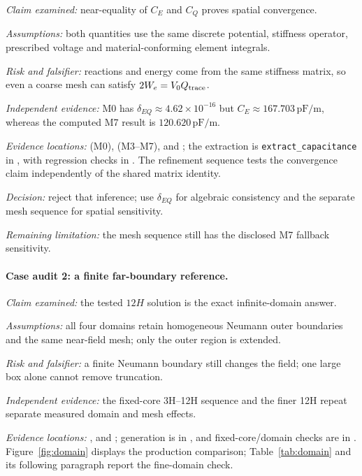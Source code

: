 \documentclass[11pt]{article}
\begin{document}
\noindent\textit{Claim examined:} near-equality of $C_E$ and $C_Q$ proves spatial convergence.

\noindent\textit{Assumptions:} both quantities use the same discrete potential, stiffness operator, prescribed voltage and material-conforming element integrals.

\noindent\textit{Risk and falsifier:} reactions and energy come from the same stiffness matrix, so even a coarse mesh can satisfy $2W_e=V_0Q_{\rm trace}$.

\noindent\textit{Independent evidence:} M0 has $\delta_{EQ}\approx4.62\times10^{-16}$ but $C_E\approx167.703\,\mathrm{pF/m}$, whereas the computed M7 result is $120.620\,\mathrm{pF/m}$.

\noindent\textit{Evidence locations:}  (M0),  (M3--M7), and ; the extraction is \texttt{extract\_capacitance} in , with regression checks in . The refinement sequence tests the convergence claim independently of the shared matrix identity.

\noindent\textit{Decision:} reject that inference; use $\delta_{EQ}$ for algebraic consistency and the separate mesh sequence for spatial sensitivity.

\noindent\textit{Remaining limitation:} the mesh sequence still has the disclosed M7 fallback sensitivity.

\paragraph{Case audit 2: a finite far-boundary reference.}

\noindent\textit{Claim examined:} the tested $12H$ solution is the exact infinite-domain answer.

\noindent\textit{Assumptions:} all four domains retain homogeneous Neumann outer boundaries and the same near-field mesh; only the outer region is extended.

\noindent\textit{Risk and falsifier:} a finite Neumann boundary still changes the field; one large box alone cannot remove truncation.

\noindent\textit{Independent evidence:} the fixed-core 3H--12H sequence and the finer 12H repeat separate measured domain and mesh effects.

\noindent\textit{Evidence locations:} ,  and ; generation is in , and fixed-core/domain checks are in . Figure~\ref{fig:domain} displays the production comparison; Table~\ref{tab:domain} and its following paragraph report the fine-domain check.
\end{document}
